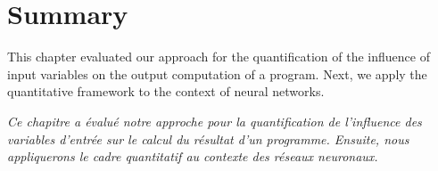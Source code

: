 \section{Summary}

This chapter evaluated our approach for the quantification of the influence of input variables on the output computation of a program. Next, we apply the quantitative framework to the context of neural networks.

\frenchdiv

\emph{Ce chapitre a évalué notre approche pour la quantification de l'influence des variables d'entrée sur le calcul du résultat d'un programme. Ensuite, nous appliquerons le cadre quantitatif au contexte des réseaux neuronaux.}
